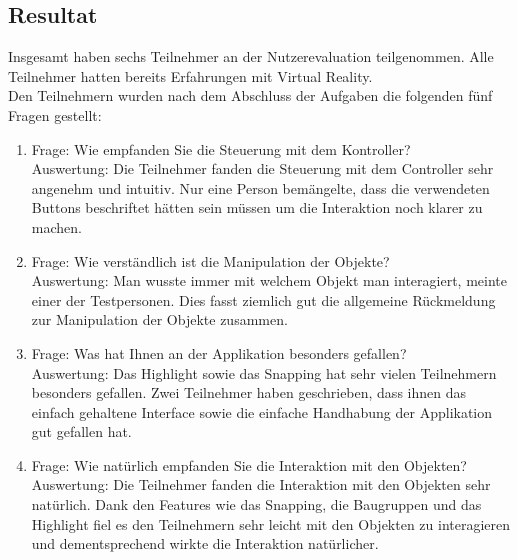 \pagebreak
\subsection{Resultat}
Insgesamt haben sechs Teilnehmer an der Nutzerevaluation teilgenommen. Alle Teilnehmer hatten bereits Erfahrungen mit Virtual Reality. \\

\noindent Den Teilnehmern wurden nach dem Abschluss der Aufgaben die folgenden fünf Fragen gestellt:

\begin{enumerate} [itemsep=2pt]
	\item Frage: Wie empfanden Sie die Steuerung mit dem Kontroller? \\
	Auswertung: Die Teilnehmer fanden die Steuerung mit dem Controller sehr angenehm und intuitiv. Nur eine Person bemängelte, dass die verwendeten Buttons beschriftet hätten sein müssen um die Interaktion noch klarer zu machen.
	
	\item Frage: Wie verständlich ist die Manipulation der Objekte? \\
	Auswertung: \grqq Man wusste immer mit welchem Objekt man interagiert\grqq{}, meinte einer der Testpersonen. Dies fasst ziemlich gut die allgemeine Rückmeldung zur Manipulation der Objekte zusammen.
	
	\item Frage: Was hat Ihnen an der Applikation besonders gefallen? \\
	Auswertung: Das Highlight sowie das Snapping hat sehr vielen Teilnehmern besonders gefallen. Zwei Teilnehmer haben geschrieben, dass ihnen das einfach gehaltene Interface sowie die einfache Handhabung der Applikation gut gefallen hat.
	
	\item Frage: Wie natürlich empfanden Sie die Interaktion mit den Objekten? \\
	Auswertung: Die Teilnehmer fanden die Interaktion mit den Objekten sehr natürlich. Dank den Features wie das Snapping, die Baugruppen und das Highlight fiel es den Teilnehmern sehr leicht mit den Objekten zu interagieren und dementsprechend wirkte die Interaktion natürlicher.
	

\end{enumerate}
